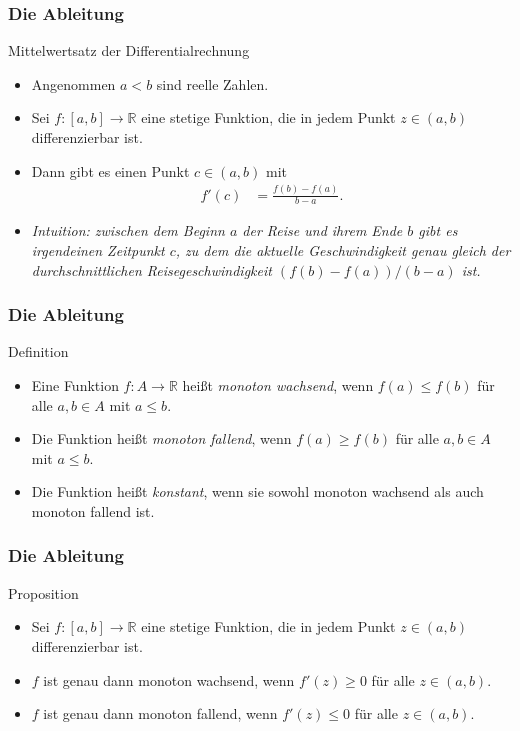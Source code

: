 \documentclass{beamer}
\renewcommand{\emph}[1]{{\textcolor{solarizedRed}{\itshape #1}}}
\newcommand\RR{\mathbb R}
\newcommand{\ue}{\"u}
\newcommand{\mytitle}{Die Ableitung}
\begin{document}
\begin{frame}\frametitle{\mytitle}
	\begin{block}{Mittelwertsatz der Differentialrechnung}
	\begin{itemize}
		\item Angenommen $a<b$ sind reelle Zahlen.
		\item Sei $f:[a,b]\to\RR$ eine stetige Funktion, die in jedem Punkt $z\in(a,b)$ differenzierbar ist.
		\item Dann gibt es einen Punkt $c\in(a,b)$ mit
			\begin{align*}
				f'(c)&=\frac{f(b)-f(a)}{b-a}.
			\end{align*}
		\item {\itshape Intuition: zwischen dem Beginn $a$ der Reise und ihrem Ende $b$ gibt es irgendeinen Zeitpunkt $c$, zu dem die aktuelle Geschwindigkeit genau gleich der durchschnittlichen Reisegeschwindigkeit $(f(b)-f(a))/(b-a)$ ist.}
	\end{itemize}
	\end{block}
\end{frame}

\begin{frame}\frametitle{\mytitle}
	\begin{block}{Definition}
	\begin{itemize}
		\item Eine Funktion $f:A\to\RR$ hei\ss t \emph{monoton wachsend}, wenn $f(a)\leq f(b)$ f\ue r alle $a,b\in A$ mit $a\leq b$.
		\item Die Funktion hei\ss t \emph{monoton fallend}, wenn $f(a)\geq f(b)$ f\ue r alle $a,b\in A$ mit $a\leq b$.
		\item Die Funktion hei\ss t \emph{konstant}, wenn sie sowohl monoton wachsend als auch monoton fallend ist.
	\end{itemize}
	\end{block}
\end{frame}

\begin{frame}\frametitle{\mytitle}
	\begin{block}{Proposition}
	\begin{itemize}
		\item Sei $f:[a,b]\to\RR$ eine stetige Funktion, die in jedem Punkt $z\in(a,b)$ differenzierbar ist.
		\item $f$ ist genau dann monoton wachsend, wenn $f'(z)\geq0$ f\ue r alle $z\in(a,b)$.
		\item $f$ ist genau dann monoton fallend, wenn $f'(z)\leq0$ f\ue r alle $z\in(a,b)$.
	\end{itemize}
	\end{block}
\end{frame}
\end{document}
